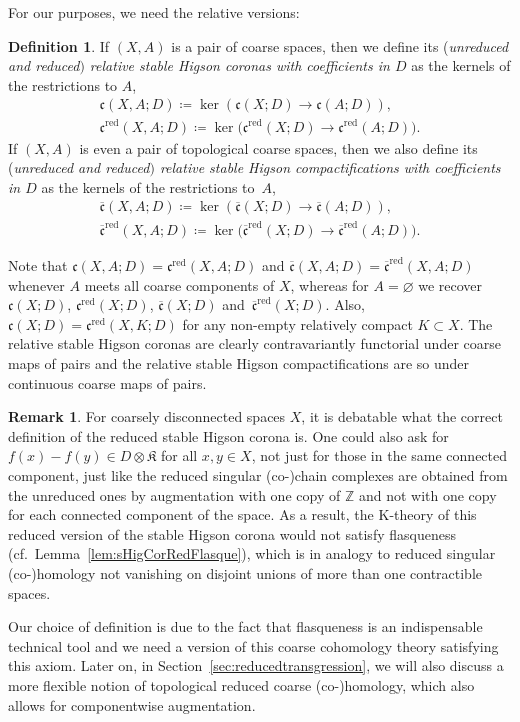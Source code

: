 \documentclass[pdftex]{sigma}
\numberwithin{equation}{section}
\theoremstyle{definition}
\newtheorem{defn}[thm]{Definition}
\newtheorem{rem}[thm]{Remark}
\newcommand{\Z}{\mathbb{Z}}
\newcommand{\K}{\mathrm{K}}
\newcommand{\sHigCom}{\overline{\mathfrak{c}}}
\newcommand{\sHigCor}{\mathfrak{c}}
\newcommand{\sHigComRed}{\overline{\mathfrak{c}}^{\mathrm{red}}}
\newcommand{\sHigCorRed}{\mathfrak{c}^{\mathrm{red}}}
\newcommand{\Kom}{{\mathfrak{K}}}
\begin{document}
For our purposes, we need the relative versions:
\begin{defn}\label{defn:stableHigsoncoronas}
If $(X,A)$ is a pair of coarse spaces, then we define its (\emph{unreduced and reduced$)$ relative stable Higson coronas with coefficients in $D$} as the kernels of the restrictions to $A$,
\begin{gather*}
\sHigCor(X,A;D)\coloneqq\ker(\sHigCor(X;D)\to\sHigCor(A;D)),
\\
\sHigCorRed(X,A;D)\coloneqq\ker\big(\sHigCorRed(X;D)\to\sHigCorRed(A;D)\big).
\end{gather*}
If $(X,A)$ is even a pair of topological coarse spaces, then we also define its (\emph{unreduced and reduced$)$ relative stable Higson compactifications with coefficients in $D$} as the kernels of the restrictions to~$A$,
\begin{gather*}
\sHigCom(X,A;D)\coloneqq\ker(\sHigCom(X;D)\to\sHigCom(A;D)),
\\
\sHigComRed(X,A;D)\coloneqq\ker\big(\sHigComRed(X;D)\to\sHigComRed(A;D)\big).
\end{gather*}
\end{defn}

Note that $\sHigCor(X,A;D)=\sHigCorRed(X,A;D)$ and $\sHigCom(X,A;D)=\sHigComRed(X,A;D)$ whenever $A$ meets all coarse components of $X$, whereas for $A=\varnothing$ we recover $\sHigCor(X;D)$, $\sHigCorRed(X;D)$, $\sHigCom(X;D)$ and~$\sHigComRed(X;D)$. Also, $\sHigCor(X;D)=\sHigCorRed(X,K;D)$ for any non-empty relatively compact $K\subset X$.
The relative stable Higson coronas are clearly contravariantly functorial under coarse maps of pairs and the relative stable Higson compactifications are so under continuous coarse maps of pairs.

\begin{rem}\label{rem:howtoreducestableHigsoncorona}
For coarsely disconnected spaces $X$, it is debatable what the correct definition of the reduced stable Higson corona is. One could also ask for $f(x)-f(y)\in D\otimes\Kom$ for all $x,y\in X$, not just for those in the same connected component, just like the reduced singular (co-)chain complexes are obtained from the unreduced ones by augmentation with one copy of $\Z$ and not with one copy for each connected component of the space. As a result, the $\K$-theory of this reduced version of the stable Higson corona would not satisfy flasqueness (cf.\ Lemma~\ref{lem:sHigCorRedFlasque}), which is in analogy to reduced singular (co-)homology not vanishing on disjoint unions of more than one contractible spaces.

Our choice of definition is due to the fact that flasqueness is an indispensable technical tool and we need a version of this coarse cohomology theory satisfying this axiom.
Later on, in Section~\ref{sec:reducedtransgression}, we will also discuss a more flexible notion of topological reduced coarse (co-)homology, which also allows for componentwise augmentation.
\end{rem}
\end{document}
